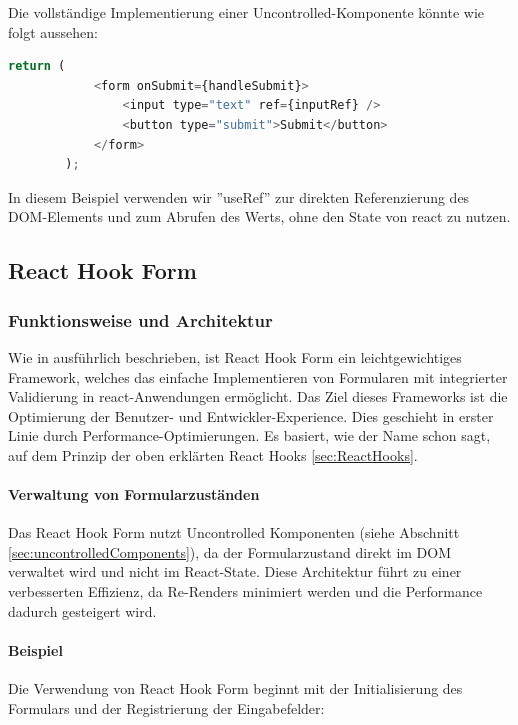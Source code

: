         Die vollständige Implementierung einer Uncontrolled-Komponente könnte wie folgt aussehen:
        
        \begin{lstlisting}[language=JavaScript]
        return (
            <form onSubmit={handleSubmit}> 
                <input type="text" ref={inputRef} />  
                <button type="submit">Submit</button>  
            </form>
        );
        \end{lstlisting}
        
        In diesem Beispiel verwenden wir ''useRef'' zur direkten Referenzierung des DOM-Elements und zum Abrufen des Werts, ohne den State von \gls{react} zu nutzen.
        
    \subsection{React Hook Form}
        \subsubsection{Funktionsweise und Architektur} 
        Wie in \cite{reacthookform} ausführlich beschrieben, ist React Hook Form ein leichtgewichtiges Framework, welches das einfache Implementieren von Formularen mit integrierter Validierung in \gls{react}-Anwendungen ermöglicht. Das Ziel dieses Frameworks ist die Optimierung der Benutzer- und Entwickler-Experience. Dies geschieht in erster Linie durch Performance-Optimierungen. Es basiert, wie der Name schon sagt, auf dem Prinzip der oben erklärten React Hooks \ref{sec:ReactHooks}. \cite{prompt12_pollak}

            \paragraph{Verwaltung von Formularzuständen}
            Das React Hook Form nutzt Uncontrolled Komponenten (siehe Abschnitt \ref{sec:uncontrolledComponents}), da der Formularzustand direkt im DOM verwaltet wird und nicht im React-State. Diese Architektur führt zu einer verbesserten Effizienz, da Re-Renders minimiert werden und die Performance dadurch gesteigert wird.

            \paragraph{Beispiel}
            Die Verwendung von React Hook Form beginnt mit der Initialisierung des Formulars und der Registrierung der Eingabefelder:
            
